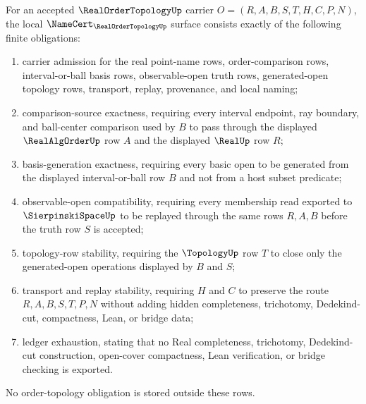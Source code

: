 \begin{theorem}
\label{thm:real-order-topology-namecert-obligations}
For an accepted $\RealOrderTopologyUp$ carrier $O=(R,A,B,S,T,H,C,P,N)$, the local $\NameCert_{\RealOrderTopologyUp}$ surface consists exactly of the following finite obligations:
\begin{enumerate}
\item carrier admission for the real point-name rows, order-comparison rows, interval-or-ball basis rows, observable-open truth rows, generated-open topology rows, transport, replay, provenance, and local naming;
\item comparison-source exactness, requiring every interval endpoint, ray boundary, and ball-center comparison used by $B$ to pass through the displayed $\RealAlgOrderUp$ row $A$ and the displayed $\RealUp$ row $R$;
\item basis-generation exactness, requiring every basic open to be generated from the displayed interval-or-ball row $B$ and not from a host subset predicate;
\item observable-open compatibility, requiring every membership read exported to $\SierpinskiSpaceUp$ to be replayed through the same rows $R,A,B$ before the truth row $S$ is accepted;
\item topology-row stability, requiring the $\TopologyUp$ row $T$ to close only the generated-open operations displayed by $B$ and $S$;
\item transport and replay stability, requiring $H$ and $C$ to preserve the route $R,A,B,S,T,P,N$ without adding hidden completeness, trichotomy, Dedekind-cut, compactness, Lean, or bridge data;
\item ledger exhaustion, stating that no Real completeness, trichotomy, Dedekind-cut construction, open-cover compactness, Lean verification, or bridge checking is exported.
\end{enumerate}
No order-topology obligation is stored outside these rows.
\end{theorem}
